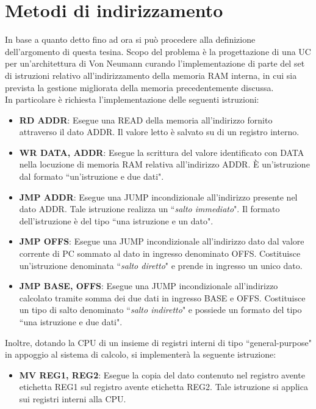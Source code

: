 \section*{Metodi di indirizzamento}
\label{metodi_di_indirizzamento}
In base a quanto detto fino ad ora si può procedere alla definizione dell'argomento di questa tesina. Scopo del problema è la progettazione di una UC per un'architettura di Von Neumann curando l'implementazione di parte del set di istruzioni relativo all'indirizzamento della memoria RAM interna, in cui sia prevista la gestione migliorata della memoria precedentemente discussa.\\
In particolare è richiesta l'implementazione delle seguenti istruzioni:
\begin{itemize}
	\item \textbf{RD ADDR}: Esegue una READ della memoria all'indirizzo fornito attraverso il dato ADDR. Il valore letto è salvato su di un registro interno.
	\item \textbf{WR DATA, ADDR}: Esegue la scrittura del valore identificato con DATA nella locuzione di memoria RAM relativa all'indirizzo ADDR. È un'istruzione dal formato \textquotedblleft un'istruzione e due dati".
	\item \textbf{JMP ADDR}: Esegue una JUMP incondizionale all'indirizzo presente nel dato ADDR. Tale istruzione realizza un \textquotedblleft \textit{salto immediato}". Il formato dell'istruzione è del tipo \textquotedblleft una istruzione e un dato".
	\item \textbf{JMP OFFS}: Esegue una JUMP incondizionale all'indirizzo dato dal valore corrente di PC sommato al dato in ingresso denominato OFFS. Costituisce un'istruzione denominata \textquotedblleft \textit{salto diretto}" e prende in ingresso un unico dato.
	\item \textbf{JMP BASE, OFFS}: Esegue una JUMP incondizionale all'indirizzo calcolato tramite somma dei due dati in ingresso BASE e OFFS. Costituisce un tipo di salto denominato \textquotedblleft \textit{salto indiretto}" e possiede un formato del tipo \textquotedblleft una istruzione e due dati".
\end{itemize}
Inoltre, dotando la CPU di un insieme di registri interni di tipo \textquotedblleft general-purpose" in appoggio al sistema di calcolo, si implementerà la seguente istruzione:
\begin{itemize}
	\item \textbf{MV REG1, REG2}: Esegue la copia del dato contenuto nel registro avente etichetta REG1 sul registro avente etichetta REG2. Tale istruzione si applica sui registri interni alla CPU.
\end{itemize}

